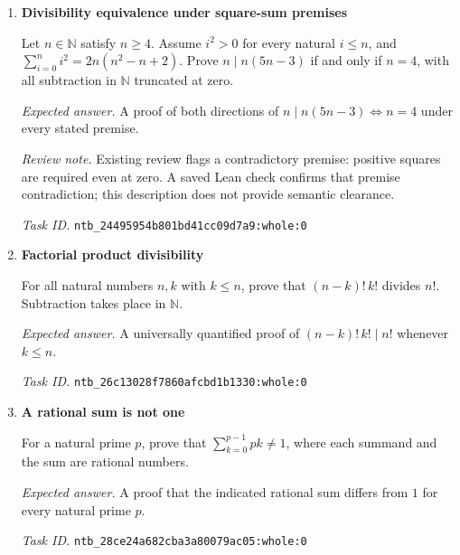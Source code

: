 \documentclass[11pt]{article}
\newcommand{\pth}[1]{\nolinkurl{#1}}
\begin{document}
\begin{enumerate}[label={DEV \arabic*.},leftmargin=4.5em,itemsep=1em]
Prove that the following conjunction is false. Its first part says that every natural prime $p$ with equal multiplicative orders of $2$ and $3$ in $\mathbb Z/p\mathbb Z$, and with some natural $k>1$ satisfying $p\mid2^k-3^k$ in the integers, satisfies $7\le p$. Its second part says that these same order-equality and existence conditions hold at $p=7$.

\emph{Expected answer.} A proof of the negation of the entire conjunction, not a proof that $7$ is a least qualifying prime.

\emph{Task ID.} \pth{ntb_12c42551bcbe67163eb49a45:whole:0}

\item \textbf{Divisibility equivalence under square-sum premises}\label{qn:dev:5}

Let $n\in\mathbb N$ satisfy $n\ge4$. Assume $i^2>0$ for every natural $i\le n$, and $\sum_{i=0}^{n}i^2=2n(n^2-n+2)$. Prove $n\mid n(5n-3)$ if and only if $n=4$, with all subtraction in $\mathbb N$ truncated at zero.

\emph{Expected answer.} A proof of both directions of $n\mid n(5n-3)\Longleftrightarrow n=4$ under every stated premise.

\emph{Review note.} Existing review flags a contradictory premise: positive squares are required even at zero. A saved Lean check confirms that premise contradiction; this description does not provide semantic clearance.

\emph{Task ID.} \pth{ntb_24495954b801bd41cc09d7a9:whole:0}

\item \textbf{Factorial product divisibility}\label{qn:dev:6}

For all natural numbers $n,k$ with $k\le n$, prove that $(n-k)!\,k!$ divides $n!$. Subtraction takes place in $\mathbb N$.

\emph{Expected answer.} A universally quantified proof of $(n-k)!\,k!\mid n!$ whenever $k\le n$.

\emph{Task ID.} \pth{ntb_26c13028f7860afcbd1b1330:whole:0}

\item \textbf{A rational sum is not one}\label{qn:dev:7}

For a natural prime $p$, prove that $\sum_{k=0}^{p-1}pk\ne1$, where each summand and the sum are rational numbers.

\emph{Expected answer.} A proof that the indicated rational sum differs from $1$ for every natural prime $p$.

\emph{Task ID.} \pth{ntb_28ce24a682cba3a80079ac05:whole:0}


\end{enumerate}
\end{document}
